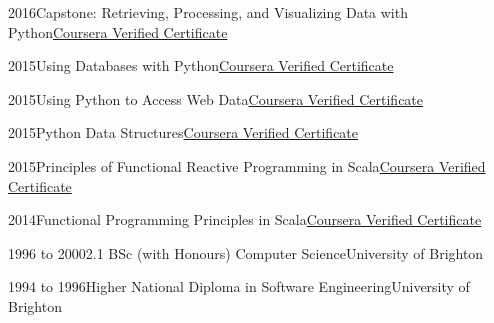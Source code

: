 \documentclass[a4paper,12pt]{article}
\newcommand{\head}[1]{\begin{center}{\large{\textbf{\sc{#1}}}}\nopagebreak\end{center}}
\newcommand{\tab}{\hspace{2em}}
\newcommand{\education}[3]{#1\tab#2\hfill#3}
\begin{document}
\education{2016}{Capstone: Retrieving, Processing, and Visualizing Data with Python}{\href{https://www.coursera.org/account/accomplishments/verify/8MKC3G5RN9S3}{Coursera Verified Certificate}}

\education{2015}{Using Databases with Python}{\href{https://www.coursera.org/account/accomplishments/verify/JNESYEJ5FURJ}{Coursera Verified Certificate}}

\education{2015}{Using Python to Access Web Data}{\href{https://www.coursera.org/account/accomplishments/verify/BVY6EDX4Z2PM}{Coursera Verified Certificate}}

\education{2015}{Python Data Structures}{\href{https://www.coursera.org/account/accomplishments/verify/VHVY2836QWWS}{Coursera Verified Certificate}}

\education{2015}{Principles of Functional Reactive Programming in Scala}{\href{https://www.coursera.org/account/accomplishments/records/8jPph3vAjsWdaQeW}{Coursera Verified Certificate}}

\education{2014}{Functional Programming Principles in Scala}{\href{https://www.coursera.org/maestro/api/certificate/get_certificate?verify-code=87DZAXY7SA}{Coursera Verified Certificate}}

\head{Education}

\education{1996 to 2000}{2.1 BSc (with Honours) Computer Science}{University of Brighton}

\education{1994 to 1996}{Higher National Diploma in Software Engineering}{University of Brighton}
\end{document}
